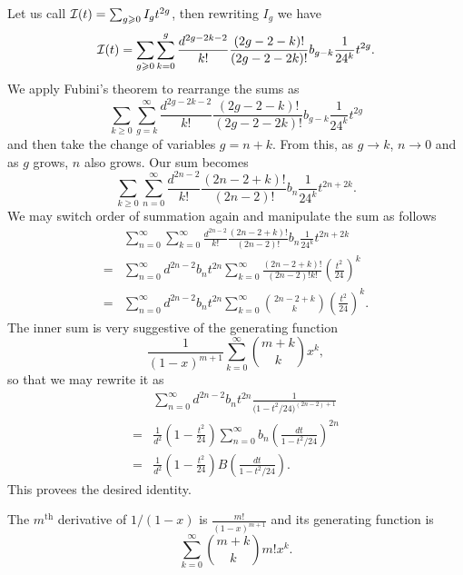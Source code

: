 \documentclass[12pt]{memoir}
\begin{document}
\begin{ptcbp}
    Let us call \(\mathcal{I}(t)=\sum_{g\geqslant 0} I_gt^{2g}\), then rewriting \(I_g\) we have
    \[
        \mathcal{I}(t)=\sum_{g\geqslant 0} \sum_{k=0}^{g}\frac{d^{2g-2k-2}}{k!}\frac{(2g-2-k)!}{(2g-2-2k)!}b_{g-k}\frac{1}{24^k}t^{2g}.
    \]
    We apply Fubini's theorem to rearrange the sums as
    \[
        \sum_{k\geq 0} \sum_{g=k}^{\infty}\frac{d^{2g-2k-2}}{k!}\frac{(2g-2-k)!}{(2g-2-2k)!}b_{g-k}\frac{1}{24^k}t^{2g}
    \]
    and then take the change of variables \(g=n+k\). From this, as \(g\to k\), \(n\to 0\) and as \(g\) grows, \(n\) also grows. Our sum becomes
    \[
        \sum_{k\geq 0} \sum_{n=0}^{\infty}\frac{d^{2n-2}}{k!}\frac{(2n-2+k)!}{(2n-2)!}b_{n}\frac{1}{24^k}t^{2n+2k}.
    \]
    We may switch order of summation again and manipulate the sum as follows
    \begin{align*}
          & \sum_{n=0}^{\infty}\sum_{k=0}^{\infty}\frac{d^{2n-2}}{k!}\frac{(2n-2+k)!}{(2n-2)!}b_{n}\frac{1}{24^k}t^{2n+2k}  \\
        = & \sum_{n=0}^{\infty}d^{2n-2}b_nt^{2n}\sum_{k=0}^{\infty}\frac{(2n-2+k)!}{(2n-2)!k!}\left(\frac{t^2}{24}\right)^k \\
        = & \sum_{n=0}^{\infty}d^{2n-2}b_nt^{2n}\sum_{k=0}^{\infty}\binom{2n-2+k}{k}\left(\frac{t^2}{24}\right)^k.
    \end{align*}
    The inner sum is very suggestive of the generating function
    \[
        \frac{1}{(1-x)^{m+1}}\sum_{k=0}^{\infty}\binom{m+k}{k} x^k,
    \]
    so that we may rewrite it as
    \begin{align*}
          & \sum_{n=0}^{\infty}d^{2n-2}b_nt^{2n}\frac{1}{\bigl(1-t^2/24\bigr)^{(2n-2)+1}}                         \\
        = & \frac{1}{d^2}\left(1-\frac{t^2}{24}\right)\sum_{n=0}^{\infty}b_n\left(\frac{dt}{1-t^2/24}\right)^{2n} \\
        = & \frac{1}{d^2}\left(1-\frac{t^2}{24}\right)B\left(\frac{dt}{1-t^2/24}\right).
    \end{align*}
    This provees the desired identity.
\end{ptcbp}

\begin{Lem}
    The \(m^{\text{th}}\) derivative of \(1/(1-x)\) is \(\frac{m!}{(1-x)^{m+1}}\) and its generating function is
    \[
        \sum_{k=0}^{\infty}\binom{m+k}{k}m! x^k.
    \]
\end{Lem}
\end{document}
